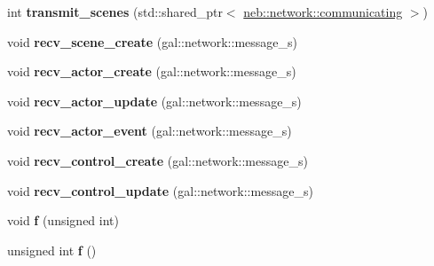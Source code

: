 \begin{DoxyCompactItemize}
\item 
\hypertarget{classneb_1_1app_a0ae9f3e3853e68b57b8ab76961151e7d}{
int {\bfseries transmit\_\-scenes} (std::shared\_\-ptr$<$ \hyperlink{classneb_1_1network_1_1communicating}{neb::network::communicating} $>$)}
\label{classneb_1_1app_a0ae9f3e3853e68b57b8ab76961151e7d}

\item 
\hypertarget{classneb_1_1app_a7a65b1cb131fba86458aa24964ad5170}{
void {\bfseries recv\_\-scene\_\-create} (gal::network::message\_\-s)}
\label{classneb_1_1app_a7a65b1cb131fba86458aa24964ad5170}

\item 
\hypertarget{classneb_1_1app_aa611d54b259485a21407eae7f71c9fde}{
void {\bfseries recv\_\-actor\_\-create} (gal::network::message\_\-s)}
\label{classneb_1_1app_aa611d54b259485a21407eae7f71c9fde}

\item 
\hypertarget{classneb_1_1app_adbaa519543d2e061c269b216b5c72ada}{
void {\bfseries recv\_\-actor\_\-update} (gal::network::message\_\-s)}
\label{classneb_1_1app_adbaa519543d2e061c269b216b5c72ada}

\item 
\hypertarget{classneb_1_1app_ad449a2212662a30fcc02f4677e535b77}{
void {\bfseries recv\_\-actor\_\-event} (gal::network::message\_\-s)}
\label{classneb_1_1app_ad449a2212662a30fcc02f4677e535b77}

\item 
\hypertarget{classneb_1_1app_aa4856f8e8eb8ccd5914689d6451f64e4}{
void {\bfseries recv\_\-control\_\-create} (gal::network::message\_\-s)}
\label{classneb_1_1app_aa4856f8e8eb8ccd5914689d6451f64e4}

\item 
\hypertarget{classneb_1_1app_a7e6cb986c8b71ed1a2e2b5116ea4d54d}{
void {\bfseries recv\_\-control\_\-update} (gal::network::message\_\-s)}
\label{classneb_1_1app_a7e6cb986c8b71ed1a2e2b5116ea4d54d}

\item 
\hypertarget{classneb_1_1app_a878745ce448b6a32639f9b28c91d3dac}{
void {\bfseries f} (unsigned int)}
\label{classneb_1_1app_a878745ce448b6a32639f9b28c91d3dac}

\item 
\hypertarget{classneb_1_1app_a4158adddede1a017c151da072503dcad}{
unsigned int {\bfseries f} ()}
\label{classneb_1_1app_a4158adddede1a017c151da072503dcad}

\end{DoxyCompactItemize}
